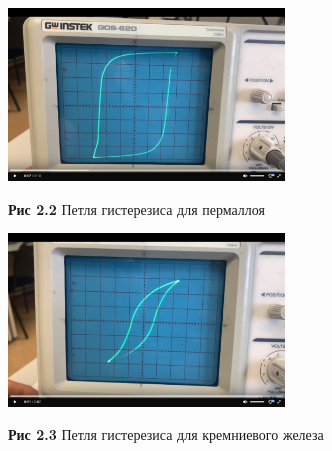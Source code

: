 \documentclass{article}
\begin{document}
\begin{center}
    \includegraphics[width=0.55\textwidth]{permalloy_p.png}
    
    \textbf{Рис 2.2} Петля гистерезиса для пермаллоя
\end{center}

\begin{center}
    \includegraphics[width=0.55\textwidth]{k_ferrum_p.png}
    
    \textbf{Рис 2.3} Петля гистерезиса для кремниевого железа
\end{center}
\end{document}
